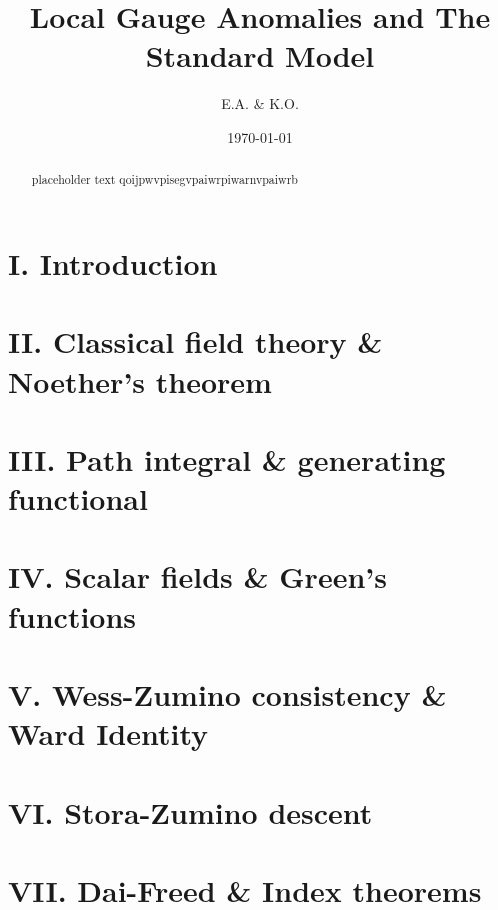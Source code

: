 \documentclass[11pt,aps,prl,lengthcheck]{revtex4-2}
\begin{document}
\title{Local Gauge Anomalies and The Standard Model}
\author{E.A. \& K.O.}
\date{\today}
\begin{abstract}
\noindent
placeholder text qoijpwvpisegvpaiwrpiwarnvpaiwrb
\end{abstract}
\maketitle

\section{I\@. Introduction}
\section{II\@. Classical field theory \& Noether's theorem}
\section{III\@. Path integral \& generating functional}
\section{IV\@. Scalar fields \& Green's functions}
\section{V\@. Wess-Zumino consistency \& Ward Identity}
\section{VI\@. Stora-Zumino descent}
\section{VII\@. Dai-Freed \& Index theorems}
\end{document}
